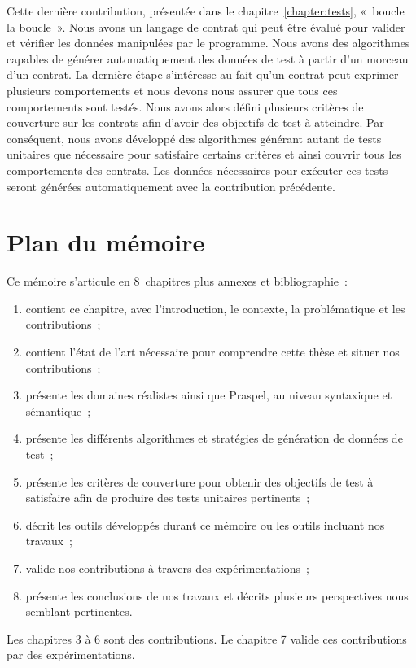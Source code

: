 Cette dernière contribution, présentée dans le chapitre~\ref{chapter:tests},
«~boucle la boucle~». Nous avons un langage de contrat qui peut être évalué pour
valider et vérifier les données manipulées par le programme. Nous avons des
algorithmes capables de générer automatiquement des données de test à partir
d'un morceau d'un contrat. La dernière étape s'intéresse au fait qu'un contrat
peut exprimer plusieurs comportements et nous devons nous assurer que tous ces
comportements sont testés. Nous avons alors défini plusieurs critères de
couverture sur les contrats afin d'avoir des objectifs de test à atteindre. Par
conséquent, nous avons développé des algorithmes générant autant de tests
unitaires que nécessaire pour satisfaire certains critères et ainsi couvrir tous
les comportements des contrats. Les données nécessaires pour exécuter ces tests
seront générées automatiquement avec la contribution précédente.

\section{Plan du mémoire}

Ce mémoire s'articule en 8~chapitres plus annexes et bibliographie~:
%
\begin{enumerate}

\item contient ce chapitre, avec l'introduction, le contexte, la problématique
et les contributions~;

\item contient l'état de l'art nécessaire pour comprendre cette thèse et situer
nos contributions~;

\item présente les domaines réalistes ainsi que Praspel, au niveau syntaxique et
sémantique~;

\item présente les différents algorithmes et stratégies de génération de données
de test~;

\item présente les critères de couverture pour obtenir des objectifs de test à
satisfaire afin de produire des tests unitaires pertinents~;

\item décrit les outils développés durant ce mémoire ou les outils incluant nos
travaux~;

\item valide nos contributions à travers des expérimentations~;

\item présente les conclusions de nos travaux et décrits plusieurs perspectives
nous semblant pertinentes.

\end{enumerate}
%
Les chapitres 3 à 6 sont des contributions. Le chapitre 7 valide ces
contributions par des expérimentations.
